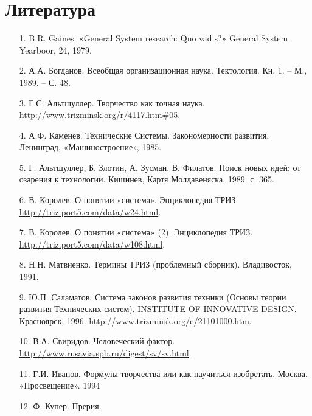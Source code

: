 \documentclass[11pt,a4paper]{article}
\begin{document}
\section*{Литература}
\begin{itemize}
\item[1.] B.R. Gaines. «General System research: Quo vadis?» General System
  Yearboor, 24, 1979.
\item[2.] А.А. Богданов. Всеобщая организационная наука. Тектология. Кн. 1. –
  М., 1989. – С. 48.
\item[3.] Г.С. Альтшуллер. Творчество как точная наука.
  \url{http://www.trizminsk.org/r/4117.htm#05}.
\item[4.] А.Ф. Каменев. Технические Системы. Закономерности развития.
  Ленинград, «Машиностроение», 1985.
\item[5.] Г. Альтшуллер, Б. Злотин, А. Зусман. В. Филатов. Поиск новых идей: от
  озарения к технологии. Кишинев, Картя Молдавеняска, 1989. с. 365.
\item[6.] В. Королев. О понятии «система». Энциклопедия ТРИЗ.
  \url{http://triz.port5.com/data/w24.html}.
\item[7.] В. Королев. О понятии «система» (2). Энциклопедия ТРИЗ.
  \url{http://triz.port5.com/data/w108.html}.
\item[8.] Н.Н. Матвиенко. Термины ТРИЗ (проблемный сборник).  Владивосток,
  1991.
\item[9.] Ю.П. Саламатов. Система законов развития техники (Основы теории
  развития Технических систем). INSTITUTE OF INNOVATIVE DESIGN. Красноярск,
  1996.  \url{http://www.trizminsk.org/e/21101000.htm}.
\item[10.] В.А. Свиридов. Человеческий фактор.
  \url{http://www.rusavia.spb.ru/digest/sv/sv.html}.
\item[11.] Г.И. Иванов. Формулы творчества или как научиться изобретать.
  Москва.  «Просвещение». 1994
\item[12.] Ф. Купер. Прерия. 
\end{itemize}
\end{document}
